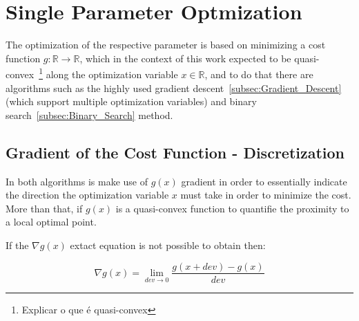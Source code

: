 \newpage %




\section{Single Parameter Optmization}
\label{sec:Single_Parameter_Optmization}


The optimization of the respective parameter is based on minimizing a cost function \(g:\mathbb{R} \to \mathbb{R}\), which in the context of this work expected to be quasi-convex~\footnote{Explicar o que é quasi-convex} along the optimization variable \(x \in \mathbb{R}\), and to do that there are algorithms such as the highly used gradient descent~\ref{subsec:Gradient_Descent} (which support multiple optimization variables) and binary search~\ref{subsec:Binary_Search} method.



\subsection{Gradient of the Cost Function - Discretization}
\label{subsec:Gradient_Cost_Function_Discretization}

In both algorithms is make use of \(g(x)\) gradient in order to essentially indicate the direction the optimization variable \(x\) must take in order to minimize the cost. More than that, if \(g(x)\) is a quasi-convex function to quantifie the proximity to a local optimal point. \par
If the \(\nabla g(x)\) extact equation is not possible to obtain then:

\begin{equation}
    \nabla g(x) = \lim_{dev \to 0} \frac{g(x + dev) - g(x)}{dev}
    \label{eq:Gradient_formula}
\end{equation}

